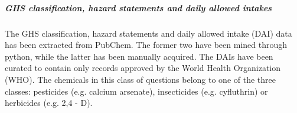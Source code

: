 \subparagraph{GHS classification, hazard statements and daily allowed intakes}

The GHS classification, hazard statements and daily allowed intake (DAI) data has been extracted from PubChem. 
The former two have been mined through python, while the latter has been manually acquired.
The DAIs have been curated to contain only records approved by the World Health Organization (WHO). 
The chemicals in this class of questions belong to one of the three classes: pesticides (e.g. calcium arsenate), insecticides (e.g. cyfluthrin) or herbicides (e.g. 2,4 - D). 
